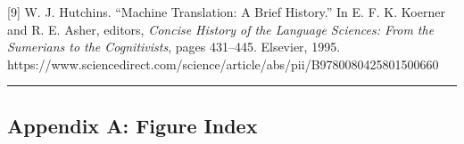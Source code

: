 {[}9{]} W. J. Hutchins. ``Machine Translation: A Brief History.'' In E. F. K. Koerner and R. E. Asher, editors, \emph{Concise History of the Language Sciences: From the Sumerians to the Cognitivists}, pages 431--445. Elsevier, 1995. https://www.sciencedirect.com/science/article/abs/pii/B9780080425801500660



\begin{center}\rule{0.5\linewidth}{0.5pt}\end{center}



\subsection{Appendix A: Figure Index}\label{appendix-a-figure-index}




